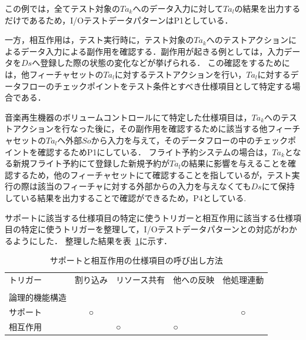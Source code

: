 この例では，全てテスト対象の$Ta_k$へのデータ入力に対して$Ta_l$の結果を出力するだけであるため，I/OテストデータパターンはP1としている．

一方，相互作用は，テスト実行時に，テスト対象の$Ta_k$へのテストアクションによるデータ入力による副作用を確認する．副作用が起きる例としては，入力データを$Ds$へ登録した際の状態の変化などが挙げられる．
この確認をするためには，他フィーチャセットの$Ta_l$に対するテストアクションを行い，$Ta_l$に対するデータフローのチェックポイントをテスト条件とすべき仕様項目として特定する場合である．

音楽再生機器のボリュームコントロールにて特定した仕様項目は，$Ta_k$へのテストアクションを行なった後に，その副作用を確認するために該当する他フィーチャセットの$Ta_l$へ外部$So$から入力を与えて，そのデータフローの中のチェックポイントを確認するためP1にしている．
フライト予約システムの場合は，$Ta_k$となる新規フライト予約にて登録した新規予約が$Ta_l$の結果に影響を与えることを確認するため，他のフィーチャセットにて確認することを指しているが，テスト実行の際は該当のフィーチャに対する外部からの入力を与えなくても$Ds$にて保持している結果を出力することで確認ができるため，P4としている.

サポートに該当する仕様項目の特定に使うトリガーと相互作用に該当する仕様項目の特定に使うトリガーを整理して，I/Oテストデータパターンとの対応がわかるようにした．
整理した結果を表~\ref{tab:D-4SandI2}に示す．
\begin{table}[htbp]
  \centering
  \caption{サポートと相互作用の仕様項目の呼び出し方法}
    \begin{tabular}{|p{5em}|c|p{4em}|p{5em}|c|}
    \hline
    トリガー  & \multicolumn{1}{p{4em}|}{割り込み} & リソース共有 & 他への反映 & \multicolumn{1}{p{5em}|}{他処理連動} \bigstrut[t]\\
    \multicolumn{1}{|l|}{} &       & \multicolumn{1}{r|}{} & \multicolumn{1}{r|}{} &  \\
    論理的機能構造 &       & \multicolumn{1}{r|}{} & \multicolumn{1}{r|}{} &  \bigstrut[b]\\
    \hline
    サポート  & \multicolumn{1}{p{4em}|}{○} & \multicolumn{1}{c|}{} & \multicolumn{1}{c|}{} & \multicolumn{1}{p{4em}|}{○} \bigstrut\\
    \hline
    相互作用  &       & ○     & ○     &  \bigstrut\\
    \hline
    \end{tabular}%
  \label{tab:D-4SandI2}%
\end{table}%

